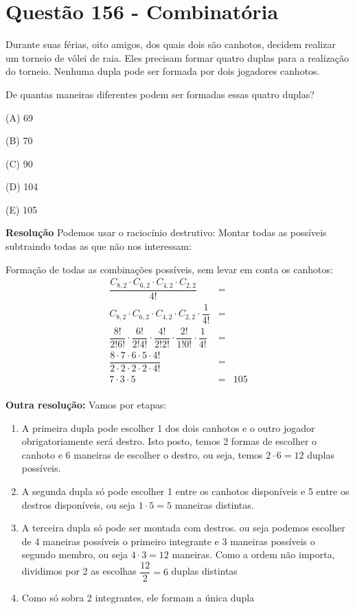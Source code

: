 \section{Questão 156 - Combinatória}

Durante suas férias, oito amigos, dos quais dois são canhotos, decidem realizar um torneio de vôlei de raia.
Eles precisam formar quatro duplas para a realização do torneio. Nenhuma dupla pode ser formada por dois jogadores canhotos.

De quantas maneiras diferentes podem ser formadas essas quatro duplas?

\noindent (A)  69

\noindent (B)  70

\noindent (C)  90

\noindent (D)  104

\noindent (E) 105

\textbf{Resolução}
Podemos usar o raciocínio destrutivo: Montar todas as possíveis subtraindo todas as que não nos interessam:

Formação de todas as combinações possíveis, sem levar em conta os canhotos: 
\begin{eqnarray*}
\dfrac{C_{8, 2} \cdot C_{6, 2} \cdot C_{4, 2} \cdot C_{2, 2}  }{4!} &=& \\
C_{8, 2} \cdot C_{6, 2} \cdot C_{4, 2} \cdot C_{2, 2}  \cdot \dfrac{1}{4!} &=& \\
\dfrac{8!}{2! 6!} \cdot \dfrac{6!}{2! 4!} \cdot \dfrac{4!}{2! 2!} \cdot \dfrac{2!}{1! 0!} \cdot \dfrac{1}{4!}  &=& \\
\dfrac{8 \cdot 7 \cdot 6 \cdot 5 \cdot 4!}{2 \cdot 2 \cdot 2 \cdot 2 \cdot 4!}  &=& \\
7 \cdot 3 \cdot 5  &=& 105\\
\end{eqnarray*}

\textbf{Outra resolução:}
Vamos por etapas:

\begin{enumerate}
    \item A primeira dupla pode escolher 1 dos dois canhotos e o outro jogador obrigatoriamente será destro. Isto posto, temos 2 formas de escolher o canhoto e 6 maneiras de escolher o destro, ou seja, temos $ 2 \cdot 6 = 12 $ duplas possíveis. 
    \item A segunda dupla só pode escolher 1 entre os canhotos disponíveis e 5 entre os destros disponíveis, ou seja $ 1 \cdot 5  = 5 $ maneiras distintas.
    \item A terceira dupla só pode ser montada com destros. ou seja podemos escolher de 4 maneiras possíveis o primeiro integrante e 3 maneiras possíveis o segundo membro, ou seja $ 4 \cdot 3  = 12 $ maneiras. Como a ordem não importa, dividimos por 2 as escolhas $ \dfrac{12}{2} = 6$ duplas distintas
    \item Como só sobra 2 integrantes, ele formam a única dupla
\end{enumerate}

